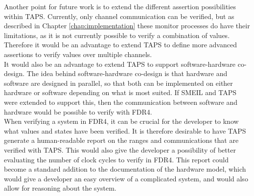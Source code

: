Another point for future work is to extend the different assertion possibilities within TAPS. Currently, only channel communication can be verified, but as described in Chapter \ref{chap:implementation}
these monitor processes do have their limitations, as it is not currently possible to verify a combination of values. Therefore it would be an advantage to extend TAPS to define more advanced assertions to verify values over multiple channels. \\

It would also be an advantage to extend TAPS to support software-hardware co-design. The idea behind software-hardware co-design is that hardware and software are designed in parallel, so that both can be implemented on either hardware or software depending on what is most suited. If SMEIL and TAPS were extended to support this, then the communication between software and hardware would be possible to verify with FDR4. \\

When verifying a system in FDR4, it can be crucial for the developer to know what values and states have been verified. It is therefore desirable to have TAPS generate a human-readable report on the ranges and communications that are verified with TAPS. This would also give the developer a possibility of better evaluating the number of clock cycles to verify in FDR4.
This report could become a standard addition to the documentation of the hardware model, which would give a developer an easy overview of a complicated system, and would also allow for reasoning about the system.